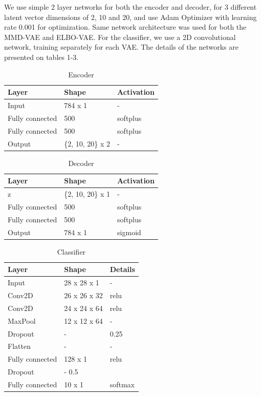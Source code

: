 \documentclass{article}
\begin{document}
We use simple 2 layer networks for both the encoder and decoder, for 3 different latent vector dimensions of 2, 10 and 20, and use Adam Optimizer with learning rate 0.001 for optimization. Same network architecture was used for both the MMD-VAE and ELBO-VAE. For the classifier, we use a 2D convolutional network, training separately for each VAE. The details of the networks are presented on tables 1-3.
\begin{table}[h]
  \caption{Encoder}
  \label{encoder}
  \centering
  \begin{tabular}{lll}
    \toprule
    Layer     & Shape     & Activation \\
    \midrule
    Input & 784 x 1  & -  \\
    Fully connected & 500 & softplus    \\
    Fully connected & 500 & softplus  \\
    Output & \{2, 10, 20\} x 2 & - \\
    \bottomrule
  \end{tabular}
\end{table}
\begin{table}[h]
  \caption{Decoder}
  \label{decoder}
  \centering
  \begin{tabular}{lll}
    \toprule
    Layer     & Shape     & Activation \\
    \midrule
    z & \{2, 10, 20\} x 1 & -  \\
    Fully connected & 500 & softplus    \\
    Fully connected & 500 & softplus  \\
    Output & 784 x 1 & sigmoid \\
    \bottomrule
  \end{tabular}
\end{table}
\begin{table}[h]
  \caption{Classifier}
  \label{classifier}
  \centering
  \begin{tabular}{lll}
    \toprule
    Layer     & Shape     & Details \\
    \midrule
    Input & 28 x 28 x 1 & -  \\
    Conv2D & 26 x 26 x 32 & relu  \\
    Conv2D & 24 x 24 x 64 & relu  \\
    MaxPool & 12 x 12 x 64 & -  \\
    Dropout & - & 0.25 \\
    Flatten & - & - \\
    Fully connected & 128 x 1 & relu \\
    Dropout & - 0.5 \\
    Fully connected & 10 x 1 & softmax \\
    \bottomrule
  \end{tabular}
\end{table}
\end{document}
